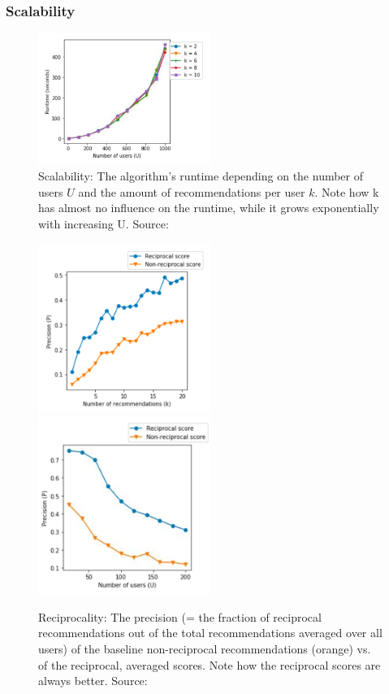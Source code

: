 \documentclass[conference]{IEEEtran}
\begin{document}
\subsubsection{Scalability} \label{paper:scalability}
\begin{figure}[!t]
	\centering
	\includegraphics[width=0.5\textwidth]{g/Runtime.PNG}
	\caption{Scalability: The algorithm's runtime depending on the number of users \(U\) and the amount of recommendations per user \(k\). Note how k has almost no influence on the runtime, while it grows exponentially with increasing U. Source: \cite{potts2018reciprocal}}
	\label{f:scalability}
\end{figure}
\begin{figure}[!t]
	\includegraphics[width=0.5\textwidth]{g/PrecisionByK.PNG}
	\includegraphics[width=0.5\textwidth]{g/PrecisionByU.PNG}
	\caption{Reciprocality: The precision (= the fraction of reciprocal recommendations out of the total recommendations averaged over all users) of the baseline non-reciprocal recommendations (orange) vs. of the reciprocal, averaged scores. Note how the reciprocal scores are always better. Source: \cite{potts2018reciprocal}}
	\label{f:reciprocality}
\end{figure}
\end{document}
